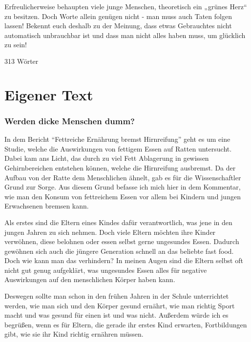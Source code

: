  

Erfreulicherweise behaupten viele junge Menschen, theoretisch ein „grünes Herz“ zu besitzen. Doch Worte allein genügen nicht - man muss auch Taten folgen lassen! Bekennt euch deshalb zu der Meinung, dass etwas Gebrauchtes nicht automatisch unbrauchbar ist und dass man nicht alles haben muss, um glücklich zu sein! 

 

313 Wörter 
\section{Eigener Text}

\subsubsection{Werden dicke Menschen dumm? }
In dem Bericht “Fettreiche Ernährung bremst Hirnreifung” geht es um eine Studie, welche die Auswirkungen von fettigem Essen auf Ratten untersucht. Dabei kam ans Licht, das durch zu viel Fett Ablagerung in gewissen Gehirnbereichen entstehen können, welche die Hirnreifung ausbremst. Da der Aufbau von der Ratte dem Menschlichen ähnelt, gab es für die Wissenschaftler Grund zur Sorge. Aus diesem Grund befasse ich mich hier in dem Kommentar, wie man den Konsum von fettreichem Essen vor allem bei Kindern und jungen Erwachsenen bremsen kann. 

 

Als erstes sind die Eltern eines Kindes dafür verantwortlich, was jene in den jungen Jahren zu sich nehmen. Doch viele Eltern möchten ihre Kinder verwöhnen, diese belohnen oder essen selbst gerne ungesundes Essen. Dadurch gewöhnen sich auch die jüngere Generation schnell an das beliebte fast food. Doch wie kann man das verhindern? In meinen Augen sind die Eltern selbst oft nicht gut genug aufgeklärt, was ungesundes Essen alles für negative Auswirkungen auf den menschlichen Körper haben kann. 

 

 Deswegen sollte man schon in den frühen Jahren in der Schule unterrichtet werden, wie man sich und den Körper gesund ernährt, wie man richtig Sport macht und was gesund für einen ist und was nicht. Außerdem würde ich es begrüßen, wenn es für Eltern, die gerade ihr erstes Kind erwarten, Fortbildungen gibt, wie sie ihr Kind richtig ernähren müssen. 

 

